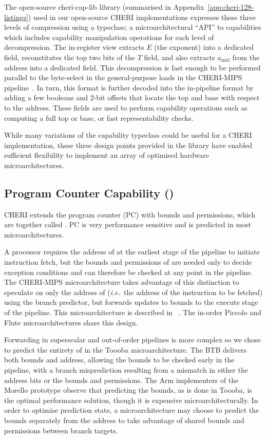 The open-source cheri-cap-lib library (summarised in Appendix~\ref{app:cheri-128-listings}) used in our open-source CHERI implementations expresses these three levels of compression using a typeclass; a microarchitectural ``API'' to capabilities
which includes capability manipulation operations for each level of decompression.
The in-register view extracts $E$ (the exponent) into a dedicated field, reconstitutes the top two bits of the $T$ field, and also extracts $a_\text{mid}$ from the address into a dedicated field.
This decompression is fast enough to be performed parallel to the byte-select in the general-purpose loads in the CHERI-MIPS pipeline~\cite{Woodruff2019}.
In turn, this format is further decoded into the in-pipeline format by adding a few booleans and 2-bit offsets that locate the top and base with respect to the address.
These fields are used to perform capability operations such as computing a full top or base, or fast
representability checks.

While many variations of the capability typeclass could be useful for
a CHERI implementation, these
three design points provided in the library have enabled sufficient flexibility to
implement an array of optimised hardware microarchitectures.

\subsection{Program Counter Capability (\PCC{})}
CHERI extends the program counter (PC) with bounds and permissions, which are together called \PCC{}.
PC is very performance sensitive and is predicted in most microarchitectures.

A processor requires the address of \PCC{} at the earliest stage of the pipeline to initiate instruction fetch, but the bounds and permissions of \PCC{} are needed only to decide exception conditions and can therefore be checked at any point in the pipeline.
The CHERI-MIPS microarchitecture takes advantage of this distinction to speculate on only the address of \PCC{} (\textit{i.e.}\ the address of the instruction to be fetched) using the branch predictor, but forwards updates to \PCC{} bounds to the execute stage of the pipeline.
This microarchitecture is described in ~\cite{woodruff:cheriisca2014}.
The in-order Piccolo and Flute microarchitectures share this design.

Forwarding in superscalar and out-of-order pipelines is more complex so we chose to predict the entirety of \PCC{} in the Toooba microarchitecture.
The BTB delivers both bounds and address, allowing the bounds to be checked early in the pipeline, with a branch misprediction resulting from a mismatch in either the address bits or the bounds and permissions.
The Arm implementers of the Morello prototype observe that predicting the bounds, as is done in Toooba, is the optimal performance solution, though it is expensive microarchitecturally.
In order to optimise prediction state, a microarchitecture may choose to predict the bounds separately from the address to take advantage of shared bounds and permissions between branch targets.

